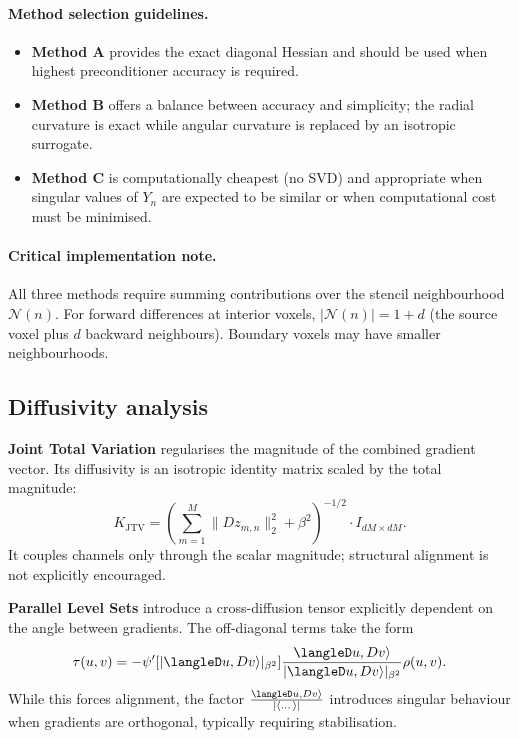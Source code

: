 \paragraph{Method selection guidelines.}
\begin{itemize}
    \item \textbf{Method A} provides the exact diagonal Hessian and should be used when highest preconditioner accuracy is required.
    \item \textbf{Method B} offers a balance between accuracy and simplicity; the radial curvature is exact while angular curvature is replaced by an isotropic surrogate.
    \item \textbf{Method C} is computationally cheapest (no SVD) and appropriate when singular values of $Y_n$ are expected to be similar or when computational cost must be minimised.
\end{itemize}

\paragraph{Critical implementation note.}
All three methods require summing contributions over the stencil neighbourhood $\mathcal{N}(n)$. For forward differences at interior voxels, $|\mathcal{N}(n)| = 1 + d$ (the source voxel plus $d$ backward neighbours). Boundary voxels may have smaller neighbourhoods.


\subsection{Diffusivity analysis}

\textbf{Joint Total Variation} regularises the magnitude of the combined gradient vector. Its diffusivity is an isotropic
identity matrix scaled by the total magnitude:
\begin{equation}
K_{\mathrm{JTV}}
=
\left(\sum_{m=1}^{M} \|D z_{m,n}\|_2^2 + \beta^2\right)^{-1/2} \cdot I_{dM \times dM}.
\end{equation}
It couples channels only through the scalar magnitude; structural alignment is not explicitly encouraged.

\textbf{Parallel Level Sets} introduce a cross-diffusion tensor explicitly dependent on the angle between gradients.
The off-diagonal terms take the form
\begin{equation}
\tau(u,v) =
-\psi'[|\langleD u, D v\rangle|_{\beta^2}]
\frac{\langleD u, D v\rangle}{|\langleD u, D v\rangle|_{\beta^2}}
\rho(u,v).
\end{equation}
While this forces alignment, the factor
$\frac{\langleD u, D v\rangle}{|\langle \dots \rangle|}$
introduces singular behaviour when gradients are orthogonal, typically requiring stabilisation.

